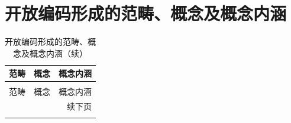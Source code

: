 \chapter{开放编码形成的范畴、概念及概念内涵}

{
\footnotesize
\begin{longtable}{p{2.5cm}p{3cm}p{9cm}}
\caption{开放编码形成的范畴、概念及概念内涵} \label{tab:open-coding} \\
\toprule
范畴 & 概念 & 概念内涵 \\
\midrule
\endfirsthead
\caption[]{开放编码形成的范畴、概念及概念内涵（续）} \\
\toprule
范畴 & 概念 & 概念内涵 \\
\midrule
\endhead
\midrule
\multicolumn{3}{r}{续下页} \\
\endfoot
\bottomrule
\endlastfoot


\end{longtable}}
